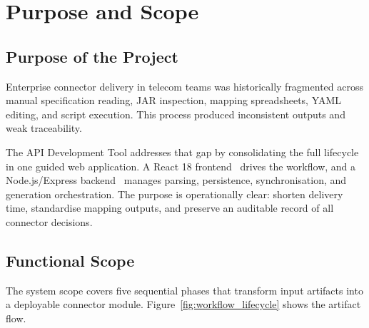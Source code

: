 \chapter{Purpose and Scope}

\section{Purpose of the Project}

Enterprise connector delivery in telecom teams was historically fragmented across manual specification reading, JAR inspection, mapping spreadsheets, YAML editing, and script execution. This process produced inconsistent outputs and weak traceability.

The API Development Tool addresses that gap by consolidating the full lifecycle in one guided web application. A React 18 frontend~\cite{react_docs} drives the workflow, and a Node.js/Express backend~\cite{express_docs} manages parsing, persistence, synchronisation, and generation orchestration. The purpose is operationally clear: shorten delivery time, standardise mapping outputs, and preserve an auditable record of all connector decisions.

\section{Functional Scope}

The system scope covers five sequential phases that transform input artifacts into a deployable connector module. Figure~\ref{fig:workflow_lifecycle} shows the artifact flow.

